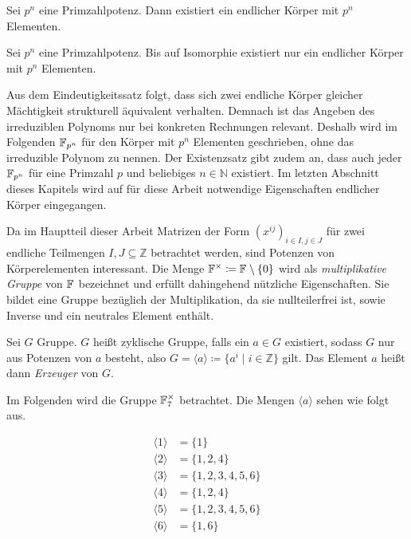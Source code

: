 \begin{satz}
    Sei $p^n$ eine Primzahlpotenz. Dann existiert ein endlicher Körper mit $p^n$ Elementen.
\end{satz}

\begin{satz}
    Sei $p^n$ eine Primzahlpotenz. Bis auf Isomorphie existiert nur ein endlicher Körper mit $p^n$ Elementen.
\end{satz}

Aus dem Eindeutigkeitssatz folgt, dass sich zwei endliche Körper gleicher Mächtigkeit strukturell äquivalent verhalten. Demnach ist das Angeben des irreduziblen Polynoms nur bei konkreten Rechnungen relevant. Deshalb wird im Folgenden $\field{p}[n]$ für den Körper mit $p^n$ Elementen geschrieben, ohne das irreduzible Polynom zu nennen. Der Existenzsatz gibt zudem an, dass auch jeder $\field{p}[n]$ für eine Primzahl $p$ und beliebiges $n \in \mathbb{N}$ existiert. Im letzten Abschnitt dieses Kapitels wird auf für diese Arbeit notwendige Eigenschaften endlicher Körper eingegangen.

Da im Hauptteil dieser Arbeit Matrizen der Form $\left( x^{ij} \right)_{i \in I,j \in J}$ für zwei endliche Teilmengen $I,J \subseteq \mathbb{Z}$ betrachtet werden, sind Potenzen von Körperelementen interessant. Die Menge $\field{}^\times \coloneqq \field{} \setminus \{0\}$ wird als \emph{multiplikative Gruppe} von $\field{}$ bezeichnet und erfüllt dahingehend nützliche Eigenschaften. Sie bildet eine Gruppe bezüglich der Multiplikation, da sie nullteilerfrei ist, sowie Inverse und ein neutrales Element enthält.

\begin{definition}
    Sei $G$ Gruppe. $G$ heißt zyklische Gruppe, falls ein $a \in G$ existiert, sodass $G$ nur aus Potenzen von $a$ besteht, also $G = \langle a \rangle \coloneqq \{ a^i \mid i \in \mathbb{Z}\}$ gilt. Das Element $a$ heißt dann \emph{Erzeuger} von $G$.
\end{definition}

Im Folgenden wird die Gruppe $\field{7}^\times$ betrachtet. Die Mengen $\langle a \rangle$ sehen wie folgt aus.

\begin{align*}
    \langle 1 \rangle &= \{ 1\} \\
    \langle 2 \rangle &= \{ 1,2,4\} \\
    \langle 3 \rangle &= \{ 1,2,3,4,5,6\} \\
    \langle 4 \rangle &= \{ 1,2,4\} \\
    \langle 5 \rangle &= \{ 1,2,3,4,5,6\} \\
    \langle 6 \rangle &= \{ 1,6\} \\
\end{align*}

